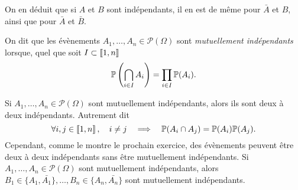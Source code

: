 \documentclass{magnolia}
\begin{document}
\begin{remarqueUnique}
\remarque On en déduit que si $A$ et $B$ sont indépendants, il en est de même pour $\bar{A}$ et $B$,
 ainsi que pour $\bar{A}$ et $\bar{B}$.
\end{remarqueUnique}

\begin{definition}
On dit que les évènements
$A_1,\ldots,A_n\in\mathcal{P}(\Omega)$ sont \emph{mutuellement indépendants} lorsque,
quel que soit $I\subset\left\llbracket 1,n\right\rrbracket$
\[\mathbb{P}\left(\bigcap_{i\in I} A_i\right)=\prod_{i\in I} \mathbb{P}(A_i).\]
\end{definition}

\begin{remarques}
\remarque Si $A_1,\ldots,A_n\in\mathcal{P}(\Omega)$ sont mutuellement indépendants, alors
  ils sont deux à deux indépendants. Autrement dit
  \[\forall i,j\in\left\llbracket 1,n\right\rrbracket,\quad i\neq j \quad\Longrightarrow\quad \mathbb{P}(A_i\cap A_j)
    =\mathbb{P}(A_i)\mathbb{P}(A_j).\]
  Cependant, comme le montre le prochain exercice, des évènements peuvent être deux à deux
  indépendants sans être mutuellement indépendants.
\remarque Si $A_1,\ldots,A_n\in\mathcal{P}(\Omega)$ sont mutuellement indépendants, alors
  $B_1\in\{A_1,\bar{A_1}\},\ldots,B_n\in\{A_n,\bar{A_n}\}$ sont mutuellement indépendants.
\end{remarques}
\end{document}
